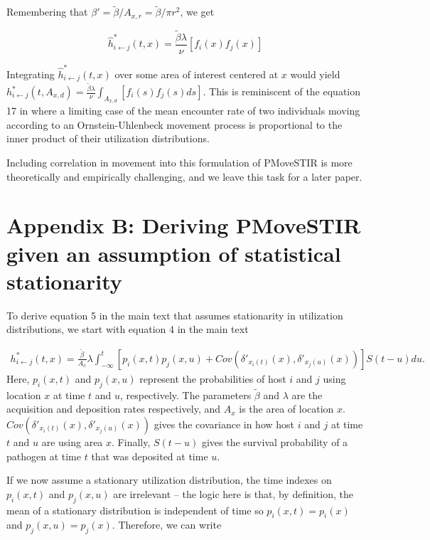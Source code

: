 \documentclass[11pt]{article}
\begin{document}
Remembering that $\beta' = \tilde{\beta} / A_{x, r} = \tilde{\beta} / \pi r^2$, we get 

\begin{equation}
    \hat{h}^*_{i \leftarrow j}(t, x) =  \frac{\tilde{\beta} \lambda}{\nu} [f_i(x) f_j(x)]
\end{equation}

Integrating $\hat{h}^*_{i \leftarrow j}(t, x)$ over some area of interest centered at $x$ would yield  $h^*_{i \leftarrow j}(t, A_{x, d}) = \frac{\tilde{\beta} \lambda}{\nu} \int_{A_{x, d}} [f_i(s) f_j(s) ds] $. This is reminiscent of the equation 17 in \cite{Martinez-Garcia2020} where a limiting case of the mean encounter rate of two individuals moving according to an Ornstein-Uhlenbeck movement process is proportional to the inner product of their utilization distributions. 

Including correlation in movement into this formulation of PMoveSTIR is more theoretically and empirically challenging, and we leave this task for a later paper.

\section*{Appendix B: Deriving PMoveSTIR given an assumption of statistical stationarity}

To derive equation 5 in the main text that assumes stationarity in utilization distributions, we start with equation 4 in the main text

\begin{equation}
    \begin{aligned}
        h^*_{i \leftarrow j}(t, x) = \frac{\tilde{\beta}}{A_x} \lambda \int_{-\infty}^{t} [p_i(x, t) p_j(x, u) + Cov(\delta'_{x_i(t)}(x), \delta'_{x_j(u)}(x))] S(t - u) du.
    \end{aligned}
    \label{eq:foi_cov}
\end{equation}
Here, $p_i(x, t)$ and $p_j(x, u)$ represent the probabilities of host $i$ and $j$ using location $x$ at time $t$ and $u$, respectively. The parameters $\tilde{\beta}$ and $\lambda$ are the acquisition and deposition rates respectively, and $A_x$ is the area of location $x$.  $Cov(\delta'_{x_i(t)}(x), \delta'_{x_j(u)}(x))$ gives the covariance in how host $i$ and $j$ at time $t$ and $u$ are using area $x$.  Finally, $S(t - u)$  gives the survival probability of a pathogen at time $t$ that was deposited at time $u$. 

If we now assume a stationary utilization distribution, the time indexes on $p_i(x, t)$ and $p_j(x, u)$ are irrelevant -- the logic here is that, by definition, the mean of a stationary distribution is independent of time so $p_i(x, t) = p_i(x)$ and $p_j(x, u) = p_j(x)$. Therefore, we can write  
\end{document}
